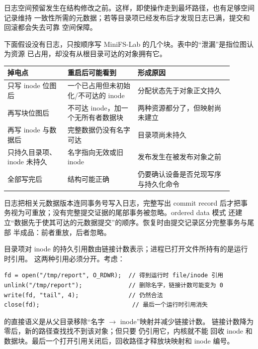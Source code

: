 日志空间预留发生在结构修改之前。这样，即使操作走到最坏路径，也有足够空间记录维持
一致性所需的元数据；若等目录项已经发布后才发现日志已满，提交和回滚都会失去可靠
空间保障。


下面假设没有日志，只按顺序写 MiniFS-Lab 的几个块。表中的“泄漏”是指位图认为资源
已占用，却没有从根目录可达的对象拥有它。

\begin{longtable}{@{}F{0.24\linewidth}F{0.28\linewidth}F{0.38\linewidth}@{}}
\toprule
{}
掉电点 & 重启后可能看到 & 形成原因 \\
\midrule
只写 inode 位图后 & 一个已占用但未初始化/不可达的 inode & 分配状态先于对象正文持久 \\\tablerowrule
再写块位图后 & 不可达 inode，加一个无所有者数据块 & 两种资源都分了，但映射尚未建立 \\\tablerowrule
再写 inode 与数据后 & 完整数据仍没有名字可达 & 目录项尚未持久 \\\tablerowrule
只持久目录项、inode 未持久 & 名字指向无效或旧 inode & 发布发生在被发布对象之前 \\\tablerowrule
全部写完后 & 结构可能正确 & 仍要确认设备是否兑现写序与持久化命令 \\
\bottomrule
\end{longtable}

日志把相关元数据版本连同事务号写入日志，完整写出 commit
record 后才把事务视为可重放；没有完整提交证据的尾部事务被忽略。ordered data 模式
还建立“数据先于使其可达的元数据提交”的顺序。恢复时由提交记录区分完整事务与尾部
半成品：前者重放，后者忽略。


目录项对 inode 的持久引用数由链接计数表示；进程已打开文件所持有的是运行时引用。
这两种引用必须分开。考虑：

\begin{lstlisting}
fd = open("/tmp/report", O_RDWR);  // 得到运行时 file/inode 引用
unlink("/tmp/report");             // 删除名字，链接计数可能变为 0
write(fd, "tail", 4);              // 仍然合法
close(fd);                          // 最后一个运行时引用消失
\end{lstlisting}

 的直接语义是从父目录移除“名字 $\rightarrow$ inode”映射并减少链接计数。
链接计数降为零后，新的路径查找找不到该对象；但只要  仍引用它，内核就不能
回收 inode 和数据块。最后一个打开引用关闭后，回收路径才释放块映射和 inode 编号。

